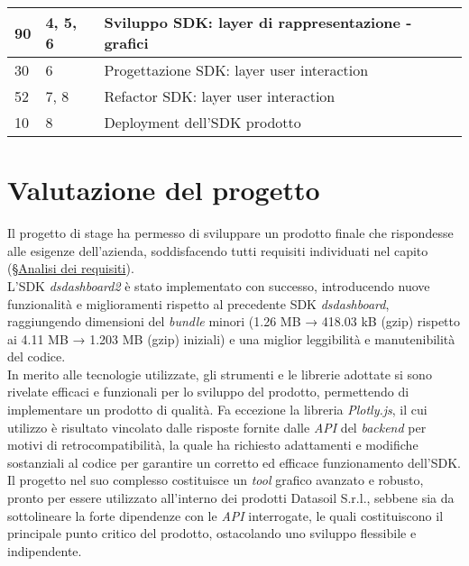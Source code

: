 \begin{center}
\begin{longtable}{|p{2.5cm}|p{2.5cm}|p{7.5cm}|}
        \hline
        90                                 & 4, 5, 6                                          & Sviluppo SDK: layer di  rappresentazione - grafici                              \\
        \hline
        30                                 & 6                                                & Progettazione SDK: layer user interaction                                       \\
        \hline
        52                                 & 7, 8                                             & Refactor SDK: layer user interaction                                            \\
        \hline
        10                                 & 8                                                & Deployment dell'SDK prodotto                                                    \\
    \end{longtable}
    \label{tab:consuntivo_finale}
\end{center}


\section{Valutazione del progetto}
Il progetto di stage ha permesso di sviluppare un prodotto finale che rispondesse alle esigenze dell'azienda, soddisfacendo tutti requisiti individuati nel capito
(\S \href{chapter:analisi_requisiti}{Analisi dei requisiti}). \\
L'SDK \textit{dsdashboard2} è stato implementato con successo, introducendo nuove funzionalità e miglioramenti rispetto al precedente SDK \textit{dsdashboard},
raggiungendo dimensioni del \textit{bundle} minori (1.26 MB → 418.03 kB (gzip) rispetto ai 4.11 MB → 1.203 MB (gzip) iniziali) e una miglior leggibilità
e manutenibilità del codice. \\
In merito alle tecnologie utilizzate, gli strumenti e le librerie adottate si sono rivelate efficaci e funzionali per lo sviluppo del prodotto, permettendo di
implementare un prodotto di qualità. Fa eccezione la libreria \textit{Plotly.js}, il cui utilizzo è risultato vincolato dalle risposte fornite dalle \textit{API} del \textit{backend} per
motivi di retrocompatibilità, la quale ha richiesto adattamenti e modifiche sostanziali al codice per garantire un corretto ed efficace funzionamento dell'SDK. \\
Il progetto nel suo complesso costituisce un \textit{tool} grafico avanzato e robusto, pronto per essere utilizzato all'interno dei prodotti Datasoil S.r.l., sebbene sia
da sottolineare la forte dipendenze con le \textit{API} interrogate, le quali costituiscono il principale punto critico del prodotto, ostacolando uno sviluppo flessibile e indipendente.

